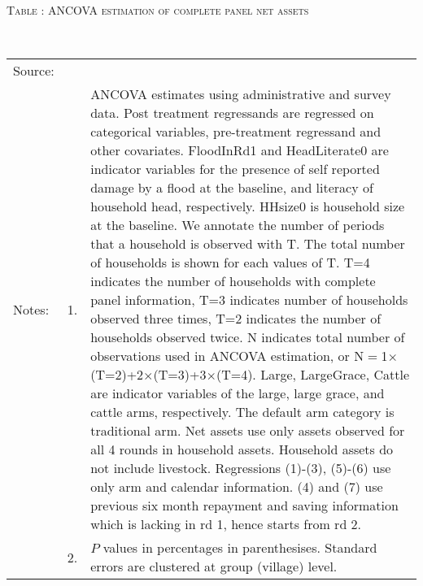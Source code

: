 \hspace{-1cm}\begin{minipage}[t]{14cm}
\hfil\textsc{\normalsize Table \thetable: ANCOVA estimation of complete panel net assets\label{tab ANCOVA complete panel net assets}}\\
\setlength{\tabcolsep}{1pt}
\setlength{\baselineskip}{8pt}
\renewcommand{\arraystretch}{.55}
\hfil{}\\
\renewcommand{\arraystretch}{.8}
\setlength{\tabcolsep}{1pt}
\begin{tabular}{>{\hfill\scriptsize}p{1cm}<{}>{\hfill\scriptsize}p{.25cm}<{}>{\scriptsize}p{12cm}<{\hfill}}
Source:& \multicolumn{2}{l}{\scriptsize Estimated with GUK administrative and survey data.}\\
Notes: & 1. & ANCOVA estimates using administrative and survey data. Post treatment regressands are regressed on categorical variables, pre-treatment regressand and other covariates. \textsf{FloodInRd1} and \textsf{HeadLiterate0} are indicator variables for the presence of self reported damage by a flood at the baseline, and literacy of household head, respectively. \textsf{HHsize0} is household size at the baseline. We annotate the number of periods that a household is observed with \textsf{T}. The total number of households is shown for each values of \textsf{T}. \textsf{T=4} indicates the number of households with complete panel information, \textsf{T=3} indicates number of households observed three times, \textsf{T=2} indicates the number of households observed twice. \textsf{N} indicates total number of observations used in ANCOVA estimation, or \textsf{N$=$1$\times$(T=2)+2$\times$(T=3)+3$\times$(T=4)}.  \textsf{Large}, \textsf{LargeGrace}, \textsf{Cattle} are indicator variables of the \textsf{large}, \textsf{large grace}, and \textsf{cattle} arms, respectively. The default arm category is \textsf{traditional} arm. Net assets use only assets observed for all 4 rounds in household assets. Household assets do not include livestock. Regressions (1)-(3), (5)-(6) use only arm and calendar information. (4) and (7) use previous six month repayment and saving information which is lacking in rd 1, hence starts from rd 2.\\
& 2. & $P$ values in percentages in parenthesises. Standard errors are clustered at group (village) level.
\end{tabular}
\end{minipage}

